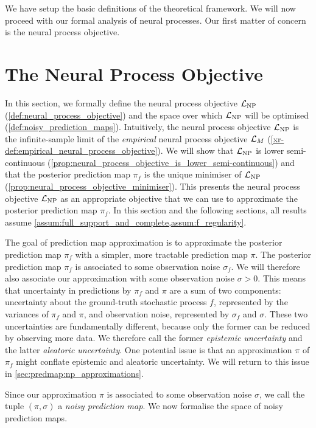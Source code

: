 \documentclass[12pt, twoside]{report}
\newcommand{\xrprefix}[1]{xr-#1}
\begin{document}
We have setup the basic definitions of the theoretical framework.
We will now proceed with our formal analysis of neural processes.
Our first matter of concern is the neural process objective.

\section{The Neural Process Objective}
\label{sec:predmap:neural_process_objective}

In this section, we formally define the neural process objective $\L\ss{NP}$ (\cref{def:neural_process_objective}) and the space over which $\L\ss{NP}$ will be optimised (\cref{def:noisy_prediction_maps}).
Intuitively, the neural process objective $\L\ss{NP}$ is the infinite-sample limit of the \emph{empirical} neural process objective $\mathcal{L}_M$ (\cref{\xrprefix{def:empirical_neural_process_objective}}).
We will show that $\L\ss{NP}$ is lower semi-continuous (\cref{prop:neural_process_objective_is_lower_semi-continuous}) and that the posterior prediction map $\pi_f$ is the unique minimiser of $\L\ss{NP}$ (\cref{prop:neural_process_objective_minimiser}).
This presents the neural process objective $\L\ss{NP}$ as an appropriate objective that we can use to approximate the posterior prediction map $\pi_f$.
In this section and the following sections, all results assume \cref{assum:full_support_and_complete,assum:f_regularity}.

The goal of prediction map approximation is to approximate the posterior prediction map $\pi_f$ with a simpler, more tractable prediction map $\pi$.
The posterior prediction map $\pi_f$ is associated to some observation noise $\sigma_f$.
We will therefore also associate our approximation with some observation noise $\sigma > 0$.
This means that uncertainty in predictions by $\pi_f$ and $\pi$ are a sum of two components:
uncertainty about the ground-truth stochastic process $f$, represented by the variances of $\pi_f$ and $\pi$,
and observation noise, represented by $\sigma_f$ and $\sigma$.
These two uncertainties are fundamentally different,
because only the former can be reduced by observing more data.
We therefore call the former \emph{epistemic uncertainty} and the latter \emph{aleatoric uncertainty}.
One potential issue is that an approximation $\pi$ of $\pi_f$ might conflate epistemic and aleatoric uncertainty.
We will return to this issue in \cref{sec:predmap:np_approximations}.

Since our approximation $\pi$ is associated to some observation noise $\sigma$, we call the tuple $(\pi, \sigma)$ a \emph{noisy prediction map}.
We now formalise the space of noisy prediction maps.
\end{document}
